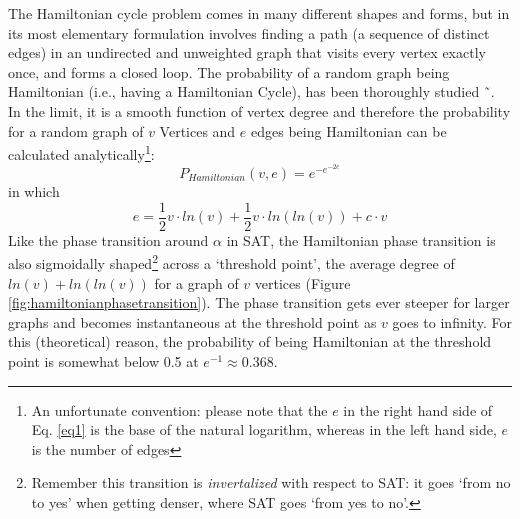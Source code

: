 \documentclass[10pt,conference,compsocconf]{IEEEtran}
\begin{document}
\noindent The Hamiltonian cycle problem comes in many different shapes and forms, but in its most elementary formulation involves finding a path (a sequence of distinct edges) in an undirected and unweighted graph that visits every vertex exactly once, and forms a closed loop. The probability of a random graph being Hamiltonian (i.e., having a Hamiltonian Cycle), has been thoroughly studied ˜\cite{erdos1960evolution,posa1976hamiltonian,komlos1983limit}. In the limit, it is a smooth function of vertex degree and therefore the probability for a random graph of $v$ Vertices and $e$ edges being Hamiltonian can be calculated analytically\footnote{An unfortunate convention: please note that the $e$ in the right hand side of Eq. \ref{eq1} is the base of the natural logarithm, whereas in the left hand side, $e$ is the number of edges}:
\begin{equation}
		P_{Hamiltonian}(v,e) = e^{-e^{-2c}}
\label{eq1}
\end{equation}
in which
\begin{equation}
		e = \frac{1}{2} v\cdot ln(v) + \frac{1}{2} v\cdot ln( ln(v)) + c \cdot v
\label{eq2}
\end{equation}
Like the phase transition around $\alpha$ in SAT, the Hamiltonian phase transition is also sigmoidally shaped\footnote{Remember this transition is \textit{invertalized} with respect to SAT: it goes `from no to yes' when getting denser, where SAT goes `from yes to no'.} across a ‘threshold point’, the average degree of $ln(v) + ln(ln(v))$  for a graph of $v$ vertices (Figure \ref{fig:hamiltonianphasetransition}). The phase transition gets ever steeper for larger graphs and becomes instantaneous at the threshold point as $v$ goes to infinity. For this (theoretical) reason, the probability of being Hamiltonian at the threshold point is somewhat below 0.5 at $e^{-1} \approx 0.368$.
\end{document}
